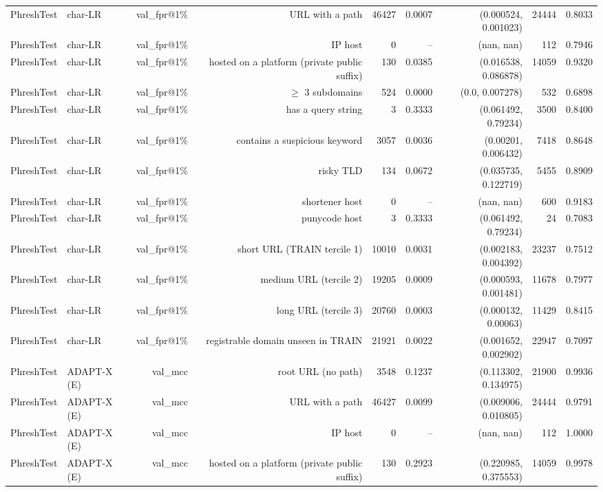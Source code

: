 \begin{table}[t]
\begin{tabular}{llrrrrrrr}
PhreshTest & char-LR & val\_fpr@1\% & URL with a path & 46427 & 0.0007 & (0.000524, 0.001023) & 24444 & 0.8033 \\
PhreshTest & char-LR & val\_fpr@1\% & IP host & 0 & -- & (nan, nan) & 112 & 0.7946 \\
PhreshTest & char-LR & val\_fpr@1\% & hosted on a platform (private public suffix) & 130 & 0.0385 & (0.016538, 0.086878) & 14059 & 0.9320 \\
PhreshTest & char-LR & val\_fpr@1\% & $\geq$ 3 subdomains & 524 & 0.0000 & (0.0, 0.007278) & 532 & 0.6898 \\
PhreshTest & char-LR & val\_fpr@1\% & has a query string & 3 & 0.3333 & (0.061492, 0.79234) & 3500 & 0.8400 \\
PhreshTest & char-LR & val\_fpr@1\% & contains a suspicious keyword & 3057 & 0.0036 & (0.00201, 0.006432) & 7418 & 0.8648 \\
PhreshTest & char-LR & val\_fpr@1\% & risky TLD & 134 & 0.0672 & (0.035735, 0.122719) & 5455 & 0.8909 \\
PhreshTest & char-LR & val\_fpr@1\% & shortener host & 0 & -- & (nan, nan) & 600 & 0.9183 \\
PhreshTest & char-LR & val\_fpr@1\% & punycode host & 3 & 0.3333 & (0.061492, 0.79234) & 24 & 0.7083 \\
PhreshTest & char-LR & val\_fpr@1\% & short URL (TRAIN tercile 1) & 10010 & 0.0031 & (0.002183, 0.004392) & 23237 & 0.7512 \\
PhreshTest & char-LR & val\_fpr@1\% & medium URL (tercile 2) & 19205 & 0.0009 & (0.000593, 0.001481) & 11678 & 0.7977 \\
PhreshTest & char-LR & val\_fpr@1\% & long URL (tercile 3) & 20760 & 0.0003 & (0.000132, 0.00063) & 11429 & 0.8415 \\
PhreshTest & char-LR & val\_fpr@1\% & registrable domain unseen in TRAIN & 21921 & 0.0022 & (0.001652, 0.002902) & 22947 & 0.7097 \\
PhreshTest & ADAPT-X (E) & val\_mcc & root URL (no path) & 3548 & 0.1237 & (0.113302, 0.134975) & 21900 & 0.9936 \\
PhreshTest & ADAPT-X (E) & val\_mcc & URL with a path & 46427 & 0.0099 & (0.009006, 0.010805) & 24444 & 0.9791 \\
PhreshTest & ADAPT-X (E) & val\_mcc & IP host & 0 & -- & (nan, nan) & 112 & 1.0000 \\
PhreshTest & ADAPT-X (E) & val\_mcc & hosted on a platform (private public suffix) & 130 & 0.2923 & (0.220985, 0.375553) & 14059 & 0.9978 \\

\end{tabular}
\end{table}
